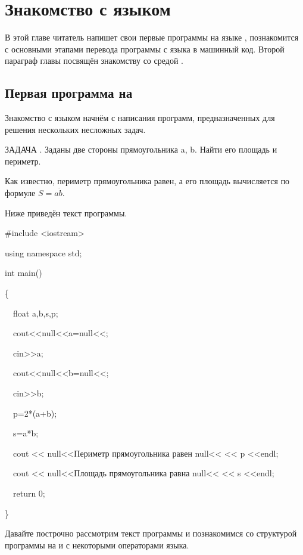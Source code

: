 \chapter[Знакомство с языком \Sys{С++}]{Знакомство с языком }

В этой главе читатель напишет свои первые программы на языке , 
познакомится с основными этапами перевода программы
с языка  в машинный код. Второй параграф главы посвящён 
знакомству со средой .

\section[Первая программа на \Sys{C++}]{Первая программа на }
Знакомство с языком  начнём с написания программ, предназначенных 
для решения нескольких несложных задач.

ЗАДАЧА {\theqwerty\label{seq:ref0}}. Заданы две стороны прямоугольника a, b. Найти его площадь и
периметр.

Как известно, периметр прямоугольника равен, а его площадь вычисляется по формуле $S=a\dot{b}$. 

Ниже приведён текст программы. 

\#include {\textless}iostream{\textgreater} 

using namespace std; 

int main() 

\{ 

\ \ float a,b,s,p; 

\ \ cout{\textless}{\textless}null{<<}a=null{<<}; 

\ \ cin{\textgreater}{\textgreater}a; 

\ \ cout{\textless}{\textless}null{<<}b=null{<<}; 

\ \ cin{\textgreater}{\textgreater}b; 

\ \ p=2*(a+b); 

\ \ s=a*b; 

\ \ cout {\textless}{\textless} null{<<}Периметр прямоугольника равен null{<<} {\textless}{\textless} p
{\textless}{\textless}endl; 

\ \ cout {\textless}{\textless} null{<<}Площадь прямоугольника равна null{<<} {\textless}{\textless} s
{\textless}{\textless}endl; 

\ \ return 0; 

\}

Давайте построчно рассмотрим текст программы и познакомимся со структурой программы на  и с некоторыми операторами
языка. 

